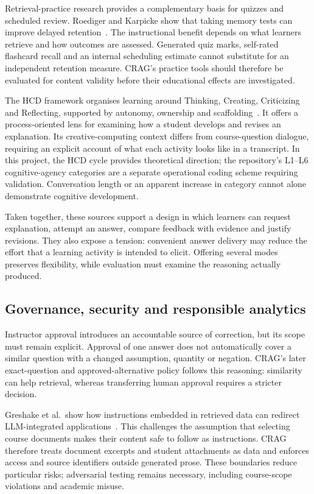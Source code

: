 \documentclass[11pt,a4paper]{article}
\begin{document}
Retrieval-practice research provides a complementary basis for quizzes and scheduled review. Roediger and Karpicke show that taking memory tests can improve delayed retention~\cite{roediger}. The instructional benefit depends on what learners retrieve and how outcomes are assessed. Generated quiz marks, self-rated flashcard recall and an internal scheduling estimate cannot substitute for an independent retention measure. CRAG's practice tools should therefore be evaluated for content validity before their educational effects are investigated.

The HCD framework organises learning around Thinking, Creating, Criticizing and Reflecting, supported by autonomy, ownership and scaffolding~\cite{hcd}. It offers a process-oriented lens for examining how a student develops and revises an explanation. Its creative-computing context differs from course-question dialogue, requiring an explicit account of what each activity looks like in a transcript. In this project, the HCD cycle provides theoretical direction; the repository's L1--L6 cognitive-agency categories are a separate operational coding scheme requiring validation. Conversation length or an apparent increase in category cannot alone demonstrate cognitive development.

Taken together, these sources support a design in which learners can request explanation, attempt an answer, compare feedback with evidence and justify revisions. They also expose a tension: convenient answer delivery may reduce the effort that a learning activity is intended to elicit. Offering several modes preserves flexibility, while evaluation must examine the reasoning actually produced.

\subsection{Governance, security and responsible analytics}
Instructor approval introduces an accountable source of correction, but its scope must remain explicit. Approval of one answer does not automatically cover a similar question with a changed assumption, quantity or negation. CRAG's later exact-question and approved-alternative policy follows this reasoning: similarity can help retrieval, whereas transferring human approval requires a stricter decision.

Greshake et al.\ show how instructions embedded in retrieved data can redirect LLM-integrated applications~\cite{greshake}. This challenges the assumption that selecting course documents makes their content safe to follow as instructions. CRAG therefore treats document excerpts and student attachments as data and enforces access and source identifiers outside generated prose. These boundaries reduce particular risks; adversarial testing remains necessary, including course-scope violations and academic misuse.
\end{document}
